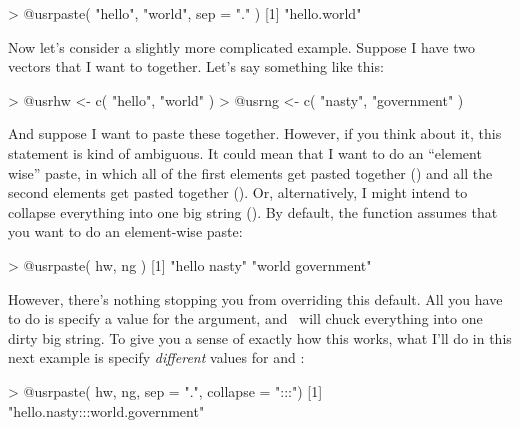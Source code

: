 \begin{rblock1}
> @usr{paste( "hello", "world", sep = "." )}
[1] "hello.world"
\end{rblock1}
Now let's consider a slightly more complicated example. Suppose I have two vectors that I want to  together. Let's say something like this:
\begin{rblock1}
> @usr{hw <- c( "hello", "world" )}
> @usr{ng <- c( "nasty", "government" )}
\end{rblock1}
And suppose I want to paste these together. However, if you think about it, this statement is kind of ambiguous. It could mean that I want to do an ``element wise'' paste, in which all of the first elements get pasted together () and all the second elements get pasted together (). Or, alternatively, I might intend to collapse everything into one big string (). By default, the  function assumes that you want to do an element-wise paste:
\begin{rblock1}
> @usr{paste( hw, ng )}
[1] "hello nasty"      "world government"
\end{rblock1}
However, there's nothing stopping you from overriding this default. All you have to do is specify a value for the  argument, and \R\ will chuck everything into one dirty big string. To give you a sense of exactly how this works, what I'll do in this next example is specify {\it different} values for  and :
\begin{rblock1}
> @usr{paste( hw, ng, sep = ".", collapse = ":::")}
[1] "hello.nasty:::world.government"
\end{rblock1}




